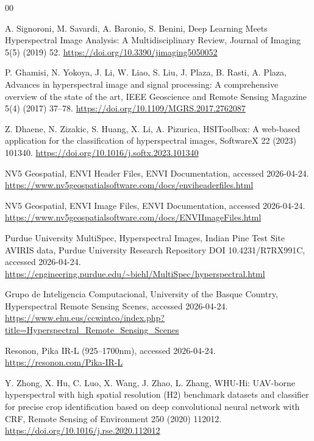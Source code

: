 \documentclass[preprint,12pt,a4paper]{elsarticle}
\begin{document}
\begin{thebibliography}{00}

A. Signoroni, M. Savardi, A. Baronio, S. Benini, Deep Learning Meets
Hyperspectral Image Analysis: A Multidisciplinary Review, Journal of Imaging
5(5) (2019) 52. \url{https://doi.org/10.3390/jimaging5050052}

P. Ghamisi, N. Yokoya, J. Li, W. Liao, S. Liu, J. Plaza, B. Rasti, A. Plaza,
Advances in hyperspectral image and signal processing: A comprehensive
overview of the state of the art, IEEE Geoscience and Remote Sensing Magazine
5(4) (2017) 37--78. \url{https://doi.org/10.1109/MGRS.2017.2762087}

Z. Dhaene, N. Zizakic, S. Huang, X. Li, A. Pizurica, HSIToolbox: A web-based
application for the classification of hyperspectral images, SoftwareX 22
(2023) 101340. \url{https://doi.org/10.1016/j.softx.2023.101340}

NV5 Geospatial, ENVI Header Files, ENVI Documentation, accessed 2026-04-24.
\url{https://www.nv5geospatialsoftware.com/docs/enviheaderfiles.html}

NV5 Geospatial, ENVI Image Files, ENVI Documentation, accessed 2026-04-24.
\url{https://www.nv5geospatialsoftware.com/docs/ENVIImageFiles.html}

Purdue University MultiSpec, Hyperspectral Images, Indian Pine Test Site AVIRIS
data, Purdue University Research Repository DOI 10.4231/R7RX991C, accessed
2026-04-24.
\url{https://engineering.purdue.edu/~biehl/MultiSpec/hyperspectral.html}

Grupo de Inteligencia Computacional, University of the Basque Country,
Hyperspectral Remote Sensing Scenes, accessed 2026-04-24.
\url{https://www.ehu.eus/ccwintco/index.php?title=Hyperspectral_Remote_Sensing_Scenes}

Resonon, Pika IR-L (925--1700nm), accessed 2026-04-24.
\url{https://resonon.com/Pika-IR-L}

Y. Zhong, X. Hu, C. Luo, X. Wang, J. Zhao, L. Zhang, WHU-Hi: UAV-borne
hyperspectral with high spatial resolution (H2) benchmark datasets and
classifier for precise crop identification based on deep convolutional neural
network with CRF, Remote Sensing of Environment 250 (2020) 112012.
\url{https://doi.org/10.1016/j.rse.2020.112012}

\end{thebibliography}
\end{document}
